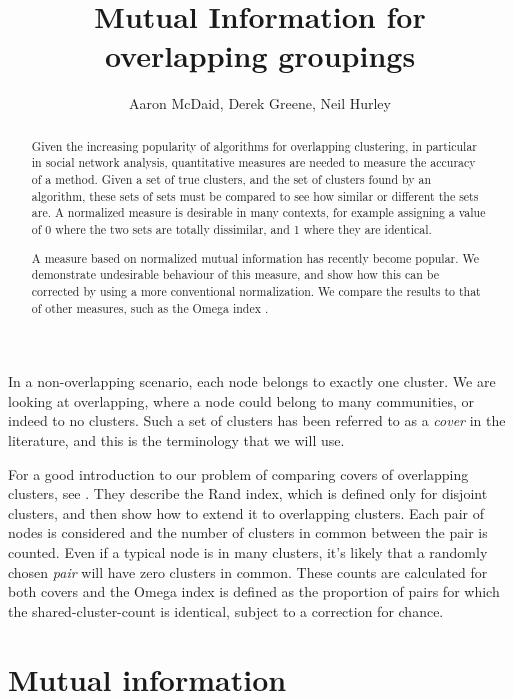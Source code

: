 \documentclass[9pt,technote]{IEEEtran}
\author{Aaron McDaid, Derek Greene, Neil Hurley}
\title{Mutual Information for overlapping groupings}
\begin{document}
\maketitle


\newcommand{\grouping}{\emph{grouping{}}}

\begin{abstract}
Given the increasing popularity of algorithms for overlapping clustering, in particular in social network analysis, quantitative measures are needed to measure the accuracy of a method.
Given a set of true clusters, and the set of clusters found by an algorithm, these sets of sets must be compared to see how similar or different the sets are.
A normalized measure is desirable in many contexts, for example assigning a value of 0 where the two sets are totally dissimilar, and 1 where they are identical.

A measure based on normalized mutual information has recently become popular. We demonstrate undesirable behaviour of this measure, and show how this can be corrected
by using a more conventional normalization. We compare the results to that of other measures, such as the Omega index \cite{collins1988omega}.
\end{abstract}


In a non-overlapping scenario, each node belongs to exactly one cluster. We are looking at overlapping, where a node could belong to many communities, or indeed to no clusters.
Such a set of clusters has been referred to as a \emph{cover} in the literature, and this is the terminology that we will use.

For a good introduction to our problem of comparing covers of overlapping clusters, see \cite{collins1988omega}.
They describe the Rand index, which is defined only for disjoint clusters, and then show how to extend it to overlapping clusters.
Each pair of nodes is considered and the number of clusters in common between the pair is counted. Even if a typical node is in many clusters,
it's likely that a randomly chosen \emph{pair} will have zero clusters in common.
These counts are calculated for both covers and the Omega index is defined as the proportion of pairs for which the shared-cluster-count is identical,
subject to a correction for chance.

\section{Mutual information}
\end{document}
